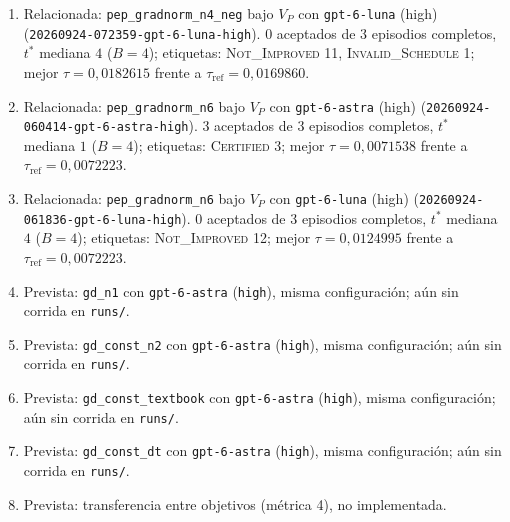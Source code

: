 \documentclass[11pt,a4paper]{article}
\begin{document}
{\begin{enumerate}
  \item Relacionada: \texttt{pep\_\allowbreak{}gradnorm\_\allowbreak{}n4\_\allowbreak{}neg} bajo $V_P$ con \texttt{gpt-\allowbreak{}6-\allowbreak{}luna} (high) (\texttt{20260924-\allowbreak{}072359-\allowbreak{}gpt-\allowbreak{}6-\allowbreak{}luna-\allowbreak{}high}). 0 aceptados de 3 episodios completos, $t^*$ mediana $4$ ($B = 4$); etiquetas: \textsc{Not\_Improved} 11, \textsc{Invalid\_Schedule} 1; mejor $\tau = 0{,}0182615$ frente a $\tau_{\mathrm{ref}} = 0{,}0169860$.
  \item Relacionada: \texttt{pep\_\allowbreak{}gradnorm\_\allowbreak{}n6} bajo $V_P$ con \texttt{gpt-\allowbreak{}6-\allowbreak{}astra} (high) (\texttt{20260924-\allowbreak{}060414-\allowbreak{}gpt-\allowbreak{}6-\allowbreak{}astra-\allowbreak{}high}). 3 aceptados de 3 episodios completos, $t^*$ mediana $1$ ($B = 4$); etiquetas: \textsc{Certified} 3; mejor $\tau = 0{,}0071538$ frente a $\tau_{\mathrm{ref}} = 0{,}0072223$.
  \item Relacionada: \texttt{pep\_\allowbreak{}gradnorm\_\allowbreak{}n6} bajo $V_P$ con \texttt{gpt-\allowbreak{}6-\allowbreak{}luna} (high) (\texttt{20260924-\allowbreak{}061836-\allowbreak{}gpt-\allowbreak{}6-\allowbreak{}luna-\allowbreak{}high}). 0 aceptados de 3 episodios completos, $t^*$ mediana $4$ ($B = 4$); etiquetas: \textsc{Not\_Improved} 12; mejor $\tau = 0{,}0124995$ frente a $\tau_{\mathrm{ref}} = 0{,}0072223$.
  \item Prevista: \texttt{gd\_\allowbreak{}n1} con \texttt{gpt-\allowbreak{}6-\allowbreak{}astra} (\texttt{high}), misma configuración; aún sin corrida en \texttt{runs/}.
  \item Prevista: \texttt{gd\_\allowbreak{}const\_\allowbreak{}n2} con \texttt{gpt-\allowbreak{}6-\allowbreak{}astra} (\texttt{high}), misma configuración; aún sin corrida en \texttt{runs/}.
  \item Prevista: \texttt{gd\_\allowbreak{}const\_\allowbreak{}textbook} con \texttt{gpt-\allowbreak{}6-\allowbreak{}astra} (\texttt{high}), misma configuración; aún sin corrida en \texttt{runs/}.
  \item Prevista: \texttt{gd\_\allowbreak{}const\_\allowbreak{}dt} con \texttt{gpt-\allowbreak{}6-\allowbreak{}astra} (\texttt{high}), misma configuración; aún sin corrida en \texttt{runs/}.
  \item Prevista: transferencia entre objetivos (métrica 4), no implementada.
\end{enumerate}
\par}
\end{document}
